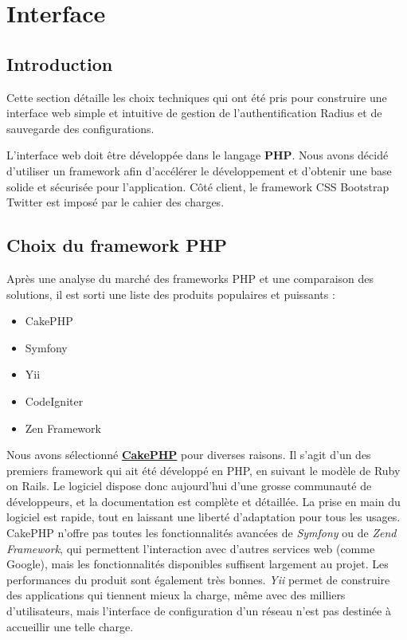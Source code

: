 \section{Interface}
\subsection{Introduction}

Cette section détaille les choix techniques qui ont été pris pour construire une interface web simple et intuitive de gestion de l'authentification Radius et de sauvegarde des configurations.

L'interface web doit être développée dans le langage \textbf{PHP}. Nous avons décidé d'utiliser un framework afin d'accélérer le développement et d'obtenir une base solide et sécurisée pour l'application. Côté client, le framework CSS Bootstrap Twitter est imposé par le cahier des charges.

\subsection{Choix du framework PHP}

Après une analyse du marché des frameworks PHP et une comparaison des solutions, il est sorti une liste des produits populaires et puissants :
\begin{itemize}
    \item CakePHP
    \item Symfony
    \item Yii
    \item CodeIgniter
    \item Zen Framework
\end{itemize}

Nous avons sélectionné \href{http://cakephp.org}{\textbf{CakePHP}} pour diverses raisons. Il s'agit d'un des premiers framework qui ait été développé en PHP, en suivant le modèle de Ruby on Rails. Le logiciel dispose donc aujourd'hui d'une grosse communauté de développeurs, et la documentation est complète et détaillée. La prise en main du logiciel est rapide, tout en laissant une liberté d'adaptation pour tous les usages. CakePHP n'offre pas toutes les fonctionnalités avancées de \emph{Symfony} ou de \emph{Zend Framework}, qui permettent l'interaction avec d'autres services web (comme Google), mais les fonctionnalités disponibles suffisent largement au projet. Les performances du produit sont également très bonnes. \emph{Yii} permet de construire des applications qui tiennent mieux la charge, même avec des milliers d'utilisateurs, mais l'interface de configuration d'un réseau n'est pas destinée à accueillir une telle charge.

